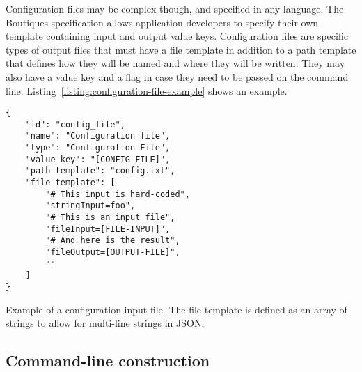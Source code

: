 \documentclass{article}
\newcommand{\boutiques}{Boutiques\xspace}
\begin{document}
Configuration files may be complex though, and specified in any
language.  The \boutiques specification allows application developers
to specify their own template containing input and output value
keys. Configuration files are specific types of output files that must
have a file template in addition to a path template that defines how
they will be named and where they will be written. They may also have
a value key and a flag in case they need to be passed on the command
line. Listing~\ref{listing:configuration-file-example} shows an
example.
\begin{listing}
\begin{verbatim}
{
    "id": "config_file",
    "name": "Configuration file",
    "type": "Configuration File",
    "value-key": "[CONFIG_FILE]",
    "path-template": "config.txt",
    "file-template": [
        "# This input is hard-coded",
        "stringInput=foo",
        "# This is an input file",
        "fileInput=[FILE-INPUT]",
        "# And here is the result",
        "fileOutput=[OUTPUT-FILE]",
        ""
    ]
}
\end{verbatim}
\caption{Example of a configuration input file. The file template is defined as
  an array of strings to allow for multi-line strings in JSON.}
\label{listing:configuration-file-example}
\end{listing}

\subsection{Command-line construction}
\end{document}
